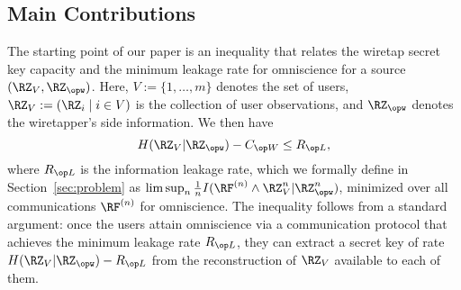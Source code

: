 
\subsection{Main Contributions}

The starting point of our paper is an inequality that relates the wiretap secret key capacity and the minimum leakage rate for omniscience for a source $(\RZ_V,\RZ_{\opw})$. Here, $V:=\{1,\ldots, m\}$ denotes the set of users, $\RZ_V:=(\RZ_i \mid i \in V)$ is the collection of user observations, and $\RZ_{\opw}$ denotes the wiretapper's side information. We then have 
     \begin{equation}
      H(\RZ_V|\RZ_{\opw}) - \wskc \leq \rl ,
      \label{basic_ineq}
        \end{equation}
  where $\rl$ is the information leakage rate, which we formally define in Section~\ref{sec:problem} as $\limsup_n\frac{1}{n}I(\RF^{(n)} \wedge \RZ_V^n|\RZ_{\opw}^n)$, minimized over all communications $\RF^{(n)}$ for omniscience.
The inequality follows from a standard argument: once the users attain omniscience via a communication protocol that achieves the minimum leakage rate $\rl$, they can extract a secret key of rate $H(\RZ_V | \RZ_{\opw}) - \rl$ from the reconstruction of $\RZ_V$ available to each of them. 

